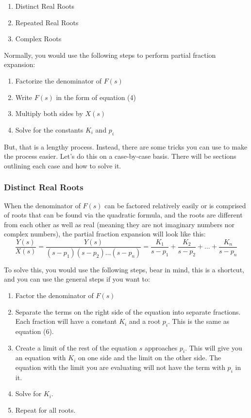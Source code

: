 \documentclass{article}
\theoremstyle{mytheoremstyle}
\theoremstyle{mytheoremstyle}
\theoremstyle{myproblemstyle}
\theoremstyle{break}
\begin{document}
\begin{enumerate}
	\item Distinct Real Roots
	\item Repeated Real Roots
	\item Complex Roots
\end{enumerate}
Normally, you would use the following steps to perform partial fraction expansion:
\begin{enumerate}
	\item Factorize the denominator of $F(s)$
	\item Write $F(s)$ in the form of equation (4)
	\item Multiply both sides by $X(s)$
	\item Solve for the constants $K_i$ and $p_i$
\end{enumerate}

But, that is a lengthy process. Instead, there are some tricks you can use to make the process easier. Let's do this on a case-by-case basis. There will be sections outlining each case and how to solve it.

\subsubsection{Distinct Real Roots}
When the denominator of $F(s)$ can be factored relatively easily or is comprised of roots that can be found via the quadratic formula, and the roots are different from each other as well as real (meaning they are not imaginary numbers nor complex numbers), the partial fraction expansion will look like this:
\begin{equation}
	\frac{Y(s)}{X(s)} = \frac{Y(s)}{(s-p_1)(s-p_2) \ldots (s-p_n)} = \frac{K_1}{s-p_1} + \frac{K_2}{s-p_2} + \ldots + \frac{K_n}{s-p_n}
\end{equation}

To solve this, you would use the following steps, bear in mind, this is a shortcut, and you can use the general steps if you want to:
\begin{enumerate}
	\item Factor the denominator of $F(s)$
	\item Separate the terms on the right side of the equation into separate fractions. Each fraction will have a constant $K_i$ and a root $p_i$. This is the same as equation (6).
	\item Create a limit of the rest of the equation $s$ approaches $p_i$. This will give you an equation with $K_i$ on one side and the limit on the other side. The equation with the limit you are evaluating will not have the term with $p_i$ in it.
	\item Solve for $K_i$.
	\item Repeat for all roots.
\end{enumerate}
\end{document}
